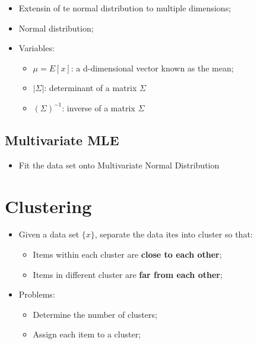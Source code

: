   \begin{itemize}
    \item Extensin of te normal distribution to multiple dimensions;
    \item Normal distribution;
    \item Variables:
    \begin{itemize}
      \item $ \mu = E[x] $: a d-dimensional vector known as the mean;
      \item $ \left| \Sigma \right| $: determinant of a matrix $ \Sigma $
      \item $ \left( \Sigma  \right)^{-1} $: inverse of a matrix $ \Sigma $
    \end{itemize}
  \end{itemize}
  
  \subsection{Multivariate MLE}
  
    \begin{itemize}
      \item Fit the data set onto Multivariate Normal Distribution
    \end{itemize}
    
\section{Clustering}
  
  \begin{itemize}
    \item Given a data set $ \{ x \} $, separate the data ites into cluster so that: 
    \begin{itemize}
      \item Items within each cluster are \textbf{close to each other};
      \item Items in different cluster are \textbf{far from each other};
    \end{itemize}
    
    \item Problems:
    \begin{itemize}
      \item Determine the number of clusters;
      \item Assign each item to a cluster;
    \end{itemize}
  \end{itemize}
    

